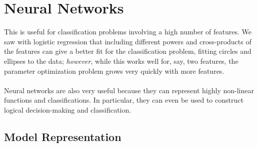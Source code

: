 \documentclass[12pt]{article}
\begin{document}
\newpage
\section{Neural Networks}

This is useful for classification problems involving a high
number of features.  We saw with logistic regression that including
different powers and cross-products of the features can give a 
better fit for the classification problem, fitting circles and ellipses
to the data; \emph{however},
while this works well for, say, two features, the parameter 
optimization problem grows very quickly with more features.  
\\
\\
Neural networks are also very useful because they can represent
highly non-linear functions and classifications.  In particular,
they can even be used to construct logical decision-making and
classification.

\subsection{Model Representation}
\end{document}
